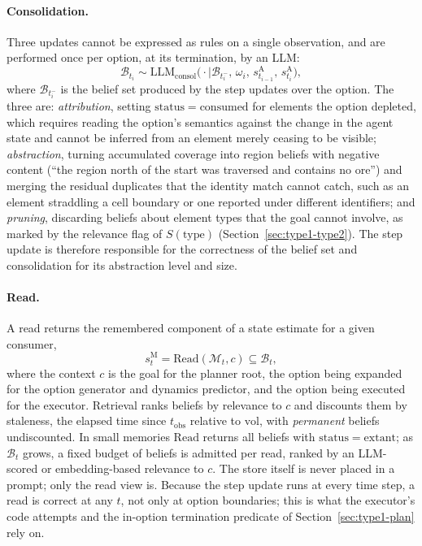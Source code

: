 \documentclass[11pt]{article}
\newcommand{\llm}[1]{\mathrm{LLM}_{\mathrm{#1}}}
\newcommand{\calM}{\mathcal{M}}
\newcommand{\calB}{\mathcal{B}}
\newcommand{\sA}{s^{\mathrm{A}}}
\newcommand{\sM}{s^{\mathrm{M}}}
\newcommand{\Read}{\mathrm{Read}}
\newcommand{\vol}{\mathrm{vol}}
\newcommand{\stat}{\mathrm{status}}
\newcommand{\type}{\mathrm{type}}
\newcommand{\tobs}{t_{\mathrm{obs}}}
\begin{document}
\paragraph{Consolidation.}
Three updates cannot be expressed as rules on a single observation, and are performed once per option, at its termination, by an LLM:
\begin{equation}
\calB_{t_i}\sim\llm{consol}\big(\cdot\mid\calB_{t_i^-},\,\omega_i,\,\sA_{t_{i-1}},\,\sA_{t_i}\big),
\label{eq:consol}
\end{equation}
where $\calB_{t_i^-}$ is the belief set produced by the step updates over the option. The three are: \emph{attribution}, setting $\stat=\mathrm{consumed}$ for elements the option depleted, which requires reading the option's semantics against the change in the agent state and cannot be inferred from an element merely ceasing to be visible; \emph{abstraction}, turning accumulated coverage into region beliefs with negative content (``the region north of the start was traversed and contains no ore'') and merging the residual duplicates that the identity match cannot catch, such as an element straddling a cell boundary or one reported under different identifiers; and \emph{pruning}, discarding beliefs about element types that the goal cannot involve, as marked by the relevance flag of $S(\type)$ (Section~\ref{sec:type1-type2}). The step update is therefore responsible for the correctness of the belief set and consolidation for its abstraction level and size.

\paragraph{Read.}
A read returns the remembered component of a state estimate for a given consumer,
\begin{equation}
\sM_t=\Read(\calM_t,c)\subseteq\calB_t,
\label{eq:read}
\end{equation}
where the context $c$ is the goal for the planner root, the option being expanded for the option generator and dynamics predictor, and the option being executed for the executor. Retrieval ranks beliefs by relevance to $c$ and discounts them by staleness, the elapsed time since $\tobs$ relative to $\vol$, with \emph{permanent} beliefs undiscounted. In small memories $\Read$ returns all beliefs with $\stat=\mathrm{extant}$; as $\calB_t$ grows, a fixed budget of beliefs is admitted per read, ranked by an LLM-scored or embedding-based relevance to $c$. The store itself is never placed in a prompt; only the read view is. Because the step update runs at every time step, a read is correct at any $t$, not only at option boundaries; this is what the executor's code attempts and the in-option termination predicate of Section~\ref{sec:type1-plan} rely on.
\end{document}
